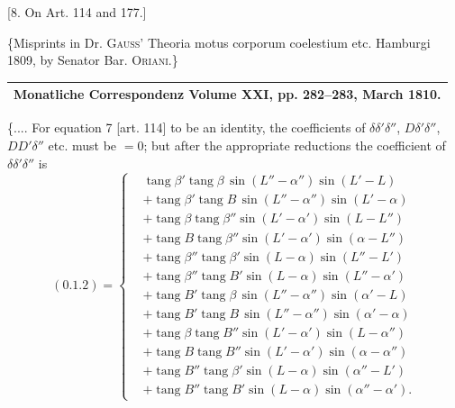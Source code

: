 \begin{center}
[8. On Art. 114 and 177.]
\end{center}
\begin{center}
\{Misprints in Dr. \textsc{Gauss}' Theoria motus corporum coelestium etc. Hamburgi 1809, by Senator Bar. \textsc{Oriani}.\}
\end{center}
\begin{center}
\begin{tabular}{c}\hline
\small Monatliche Correspondenz Volume XXI, pp. 282--283, March 1810.\\\hline
\end{tabular}
\end{center}
\{.... For equation 7 [art. 114] to be an identity, the coefficients of \(\delta\delta'\delta''\), \(D\delta'\delta''\), \(DD'\delta''\) etc. must be \(=0\); but after the appropriate reductions the coefficient of \(\delta\delta'\delta''\) is
\[
(0.1.2)=\left\{\begin{aligned}
&\operatorname{tang}\beta'\operatorname{tang}\beta\,\sin(L''-\alpha'')\sin(L'-L)\\
&+\operatorname{tang}\beta'\operatorname{tang}B\,\sin(L''-\alpha'')\sin(L'-\alpha)\\
&+\operatorname{tang}\beta\operatorname{tang}\beta''\sin(L'-\alpha')\sin(L-L'')\\
&+\operatorname{tang}B\operatorname{tang}\beta''\sin(L'-\alpha')\sin(\alpha-L'')\\
&+\operatorname{tang}\beta''\operatorname{tang}\beta'\sin(L-\alpha)\sin(L''-L')\\
&+\operatorname{tang}\beta''\operatorname{tang}B'\sin(L-\alpha)\sin(L''-\alpha')\\
&+\operatorname{tang}B'\operatorname{tang}\beta\,\sin(L''-\alpha'')\sin(\alpha'-L)\\
&+\operatorname{tang}B'\operatorname{tang}B\,\sin(L''-\alpha'')\sin(\alpha'-\alpha)\\
&+\operatorname{tang}\beta\operatorname{tang}B''\sin(L'-\alpha')\sin(L-\alpha'')\\
&+\operatorname{tang}B\operatorname{tang}B''\sin(L'-\alpha')\sin(\alpha-\alpha'')\\
&+\operatorname{tang}B''\operatorname{tang}\beta'\sin(L-\alpha)\sin(\alpha''-L')\\
&+\operatorname{tang}B''\operatorname{tang}B'\sin(L-\alpha)\sin(\alpha''-\alpha').
\end{aligned}\right.
\]
